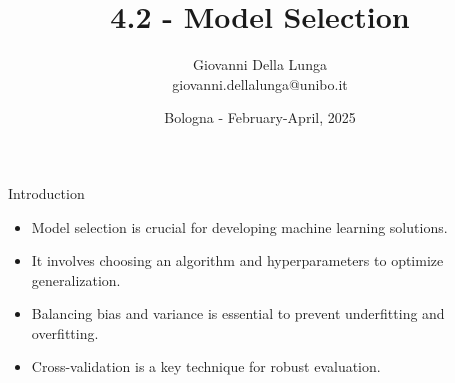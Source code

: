\documentclass[11pt]{beamer}
\author{Giovanni Della Lunga\\{\footnotesize giovanni.dellalunga@unibo.it}}
\title{4.2 - Model Selection}
\subtitle{} %
\date{Bologna - February-April, 2025}
\begin{document}
\begin{frame}
\titlepage
\end{frame}

\AtBeginSubsection{\frame{\subsectionpage}}


%



\begin{frame}{Introduction}
    \begin{itemize}
        \item Model selection is crucial for developing machine learning solutions.
        \item It involves choosing an algorithm and hyperparameters to optimize generalization.
        \item Balancing bias and variance is essential to prevent underfitting and overfitting.
        \item Cross-validation is a key technique for robust evaluation.
    \end{itemize}
\end{frame}
\end{document}
